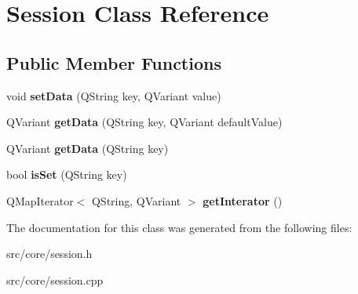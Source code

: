 \hypertarget{classSession}{
\section{Session Class Reference}
\label{classSession}
}
\subsection*{Public Member Functions}
\begin{DoxyCompactItemize}
\item 
\hypertarget{classSession_ab31a6a7fa69bf2ca84d7046bd83d66ab}{
void {\bfseries setData} (QString key, QVariant value)}
\label{classSession_ab31a6a7fa69bf2ca84d7046bd83d66ab}

\item 
\hypertarget{classSession_a5bd85ddefbd7e84c4031bb8c742da11a}{
QVariant {\bfseries getData} (QString key, QVariant defaultValue)}
\label{classSession_a5bd85ddefbd7e84c4031bb8c742da11a}

\item 
\hypertarget{classSession_a8cf7d327ff7192d9959765bf1a1237a6}{
QVariant {\bfseries getData} (QString key)}
\label{classSession_a8cf7d327ff7192d9959765bf1a1237a6}

\item 
\hypertarget{classSession_a8af684ddcfedd8513da711468aa64166}{
bool {\bfseries isSet} (QString key)}
\label{classSession_a8af684ddcfedd8513da711468aa64166}

\item 
\hypertarget{classSession_afc7ee4387645c77ae321544448de6202}{
QMapIterator$<$ QString, QVariant $>$ {\bfseries getInterator} ()}
\label{classSession_afc7ee4387645c77ae321544448de6202}

\end{DoxyCompactItemize}


The documentation for this class was generated from the following files:\begin{DoxyCompactItemize}
\item 
src/core/session.h\item 
src/core/session.cpp\end{DoxyCompactItemize}
